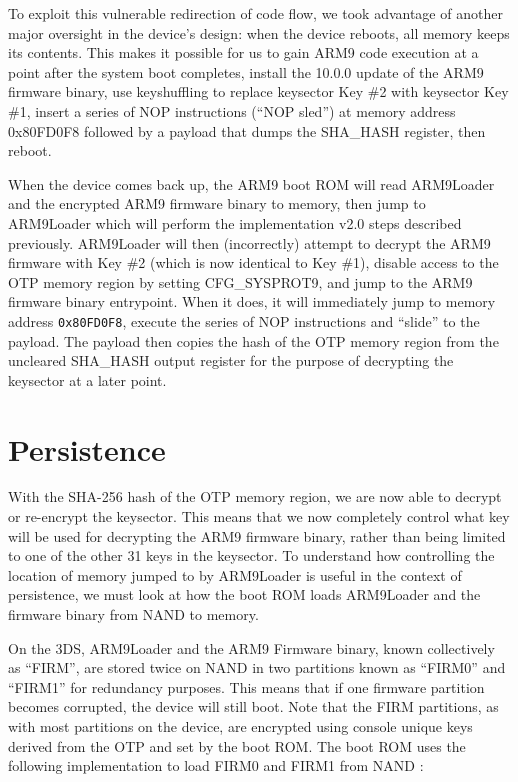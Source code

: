 \documentclass[journal]{IEEEtran}
\begin{document}
To exploit this vulnerable redirection of code flow, we took advantage of
another major oversight in the device's design: when the device reboots, all
memory keeps its contents. This makes it possible for us to gain ARM9 code
execution at a point after the system boot completes, install the 10.0.0 update
of the ARM9 firmware binary, use keyshuffling to replace keysector Key \#2 with
keysector Key \#1, insert a series of NOP instructions (``NOP sled'') at memory
address 0x80FD0F8 followed by a payload that dumps the SHA\_HASH register, then
reboot.

When the device comes back up, the ARM9 boot ROM will read ARM9Loader and the
encrypted ARM9 firmware binary to memory, then jump to ARM9Loader which will
perform the implementation v2.0 steps described previously. ARM9Loader will then
(incorrectly) attempt to decrypt the ARM9 firmware with Key \#2 (which is now
identical to Key \#1), disable access to the OTP memory region by setting
CFG\_SYSPROT9, and jump to the ARM9 firmware binary entrypoint. When it does, it
will immediately jump to memory address \texttt{0x80FD0F8}, execute the series
of NOP instructions and ``slide'' to the payload. The payload then copies the hash
of the OTP memory region from the uncleared SHA\_HASH output register for the
purpose of decrypting the keysector at a later point.

\section{Persistence}

With the SHA-256 hash of the OTP memory region, we are now able to decrypt or
re-encrypt the keysector. This means that we now completely control what key
will be used for decrypting the ARM9 firmware binary, rather than being limited
to one of the other 31 keys in the keysector. To understand how controlling the
location of memory jumped to by ARM9Loader is useful in the context of
persistence, we must look at how the boot ROM loads ARM9Loader and the firmware
binary from NAND to memory.

On the 3DS, ARM9Loader and the ARM9 Firmware binary, known collectively as
``FIRM'', are stored twice on NAND in two partitions known as ``FIRM0'' and ``FIRM1''
for redundancy purposes. This means that if one firmware partition becomes
corrupted, the device will still boot. Note that the FIRM partitions, as with
most partitions on the device, are encrypted using console unique keys derived
from the OTP and set by the boot ROM. The boot ROM uses the following
implementation to load FIRM0 and FIRM1 from NAND
\cite{clevermind}\cite{Bootloader}\cite{OTP_Registers}:
\end{document}
